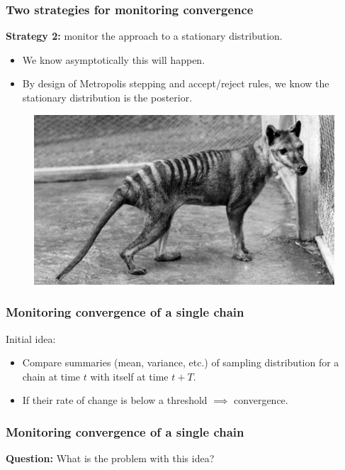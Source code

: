 \documentclass[handout]{beamer}
\begin{document}
\begin{frame}
\frametitle{Two strategies for monitoring convergence}

\textbf{Strategy 2:} monitor the approach to a stationary distribution.

\begin{itemize}
\item<3-> We know asymptotically this will happen.
\item<4-> By design of Metropolis stepping and accept/reject rules, we know the stationary distribution is the posterior.
\end{itemize}

\begin{figure}[ht]
\centerline{\includegraphics[width=1\textwidth]{./Figures/thylacine.jpg}}
\end{figure}

\end{frame}

\begin{frame}
\frametitle{Monitoring convergence of a single chain}

Initial idea:
\begin{itemize}
\item<2-> Compare summaries (mean, variance, etc.) of sampling distribution for a chain at time $t$ with itself at time $t+T$.
\item<3-> If their rate of change is below a threshold $\implies$ convergence.
\end{itemize}

\end{frame}

\begin{frame}
\frametitle{Monitoring convergence of a single chain}
\Large \textbf{Question:} What is the problem with this idea?
\end{frame}
\end{document}
